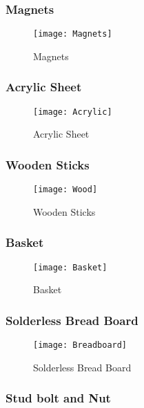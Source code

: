\documentclass[12pt]{article}
\begin{document}
\subsubsection{Magnets} \label{subsub:magnets}

\begin{figure}[H]
	\centering
	\texttt{[image: Magnets]}
	\caption{Magnets} \label{fig:magnets}
\end{figure}

\subsubsection{Acrylic Sheet} \label{subsub:acrylic}

\begin{figure}[H]
	\centering
	\texttt{[image: Acrylic]}
	\caption{Acrylic Sheet} \label{fig:acrylic}
\end{figure}

\subsubsection{Wooden Sticks} \label{subsub:sticks}

\begin{figure}[H]
	\centering
	\texttt{[image: Wood]}
	\caption{Wooden Sticks} \label{fig:sticks}
\end{figure}

\subsubsection{Basket} \label{subsub:basket}

\begin{figure}[H]
	\centering
	\texttt{[image: Basket]}
	\caption{Basket} \label{fig:basket}
\end{figure}

\subsubsection{Solderless Bread Board} \label{subsub:breadboard}

\begin{figure}[H]
	\centering
	\texttt{[image: Breadboard]}
	\caption{Solderless Bread Board} \label{fig:breadboard}
\end{figure}

\subsubsection{Stud bolt and Nut} \label{subsub:stud}
\end{document}
